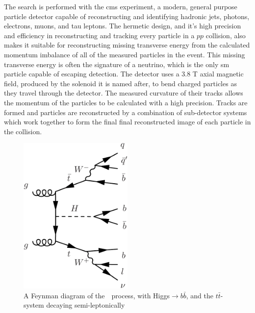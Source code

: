 \par The search is performed with the \acrshort{cms} experiment, a modern, general purpose particle detector capable of reconstructing and identifying hadronic jets, photons, electrons, muons, and tau leptons.  The hermetic design, and it's high precision and efficiency in reconstructing and tracking every particle in a $pp$ collision, also makes it suitable for reconstructing missing transverse energy from the calculated momentum imbalance of all of the measured particles in the event.  This missing transverse energy is often the signature of a neutrino, which is the only \acrshort{sm} particle capable of escaping detection.  The detector uses a 3.8 T axial magnetic field, produced by the solenoid it is named after, to bend charged particles as they travel through the detector.  The measured curvature of their tracks allows the momentum of the particles to be calculated with a high precision.  Tracks are formed and particles are reconstructed by a combination of sub-detector systems which work together to form the final final reconstructed image of each particle in the collision.  

\begin{figure}[h]
   \centering
  \includegraphics[width=0.5\textwidth]{Figures/Feynman_Diagrams/higgs_production__tth_semileptonic.pdf}
  \caption{A Feynman diagram of the~\ttH~process, with Higgs$\rightarrow$$b\bar{b}$, and the $t\bar{t}$-system decaying semi-leptonically} \label{fd:ttH_semiLep}
\end{figure}

